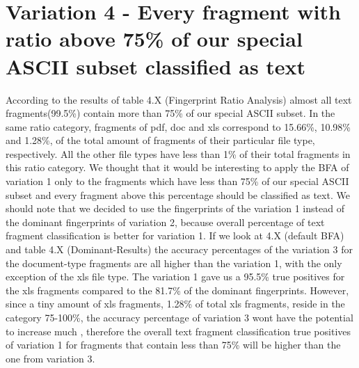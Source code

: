 \section{Variation 4 - Every fragment with ratio above 75\% of our special ASCII subset classified as text } 
According to the results of table 4.X (Fingerprint Ratio Analysis) almost all text fragments(99.5\%) contain more than 75\% of our special ASCII subset. In the same ratio category, fragments of pdf, doc and xls correspond to 15.66\%, 10.98\% and 1.28\%, of the total amount of fragments of their particular file type, respectively. All the other file types have less than 1\% of their total fragments in this ratio category. We thought that it would be interesting to apply the BFA of variation 1 only to the fragments which have less than 75\% of our special ASCII subset and every fragment above this percentage should be classified as text. We should note that we decided to use the fingerprints of the variation 1 instead of the dominant fingerprints of variation 2, because overall percentage of text fragment classification is better for variation 1. 
If we look at 4.X (default BFA) and table 4.X (Dominant-Results) the accuracy percentages of the variation 3 for the document-type fragments are all higher than the variation 1, with the only exception of the xls file type. The variation 1 gave us a 95.5\% true positives for the xls fragments compared to the 81.7\% of the dominant fingerprints. 
However, since a tiny amount of xls fragments, 1.28\% of total xls fragments, reside in the category 75-100\%, the accuracy percentage of variation 3 wont have the potential to increase much , therefore the overall text fragment classification true positives of variation 1 for fragments that contain less than 75\% will be higher than the one from variation 3. 
